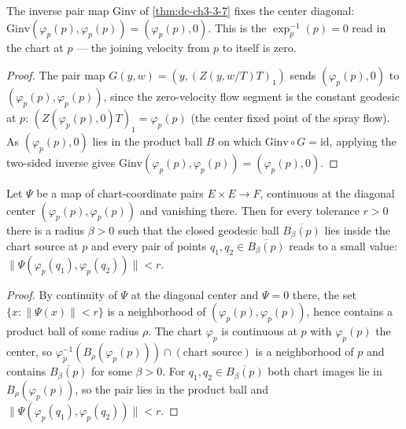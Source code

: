 \begin{lemma}
  \label{lem:dc-ch3-4-2-invdiagonal}


  The inverse pair map $\mathrm{Ginv}$ of \cref{thm:dc-ch3-3-7} fixes the center
  diagonal: $\mathrm{Ginv}(\varphi_p(p),\varphi_p(p))=(\varphi_p(p),0)$. This is
  the $\exp_p^{-1}(p)=0$ read in the chart at $p$ — the joining velocity
  from $p$ to itself is zero.
\end{lemma}
\begin{proof}
  \sketch

  The pair map $G(y,w)=(y,(Z(y,w/T)T)_1)$ sends $(\varphi_p(p),0)$ to
  $(\varphi_p(p),\varphi_p(p))$, since the zero-velocity flow segment is the
  constant geodesic at $p$: $(Z(\varphi_p(p),0)T)_1=\varphi_p(p)$ (the center
  fixed point of the spray flow). As $(\varphi_p(p),0)$ lies in the product ball
  $B$ on which $\mathrm{Ginv}\circ G=\mathrm{id}$, applying the two-sided inverse
  gives $\mathrm{Ginv}(\varphi_p(p),\varphi_p(p))=(\varphi_p(p),0)$.
\end{proof}

\begin{lemma}
  \label{lem:dc-ch3-4-2-pairsmall}


  Let $\Psi$ be a map of chart-coordinate pairs $E\times E\to F$, continuous at the
  diagonal center $(\varphi_p(p),\varphi_p(p))$ and vanishing there. Then for every
  tolerance $r>0$ there is a radius $\beta>0$ such that the closed geodesic ball
  $\overline{B_\beta(p)}$ lies inside the chart source at $p$ and every pair of
  points $q_1,q_2\in\overline{B_\beta(p)}$ reads to a small value:
  $\|\Psi(\varphi_p(q_1),\varphi_p(q_2))\|<r$.
\end{lemma}
\begin{proof}
  \sketch

  By continuity of $\Psi$ at the diagonal center and $\Psi=0$ there, the set
  $\{x:\|\Psi(x)\|<r\}$ is a neighborhood of $(\varphi_p(p),\varphi_p(p))$, hence
  contains a product ball of some radius $\rho$. The chart $\varphi_p$ is
  continuous at $p$ with $\varphi_p(p)$ the center, so
  $\varphi_p^{-1}(B_\rho(\varphi_p(p)))\cap(\text{chart source})$ is a neighborhood
  of $p$ and contains $\overline{B_\beta(p)}$ for some $\beta>0$. For
  $q_1,q_2\in\overline{B_\beta(p)}$ both chart images lie in $B_\rho(\varphi_p(p))$,
  so the pair lies in the product ball and $\|\Psi(\varphi_p(q_1),\varphi_p(q_2))\|<r$.

\end{proof}

